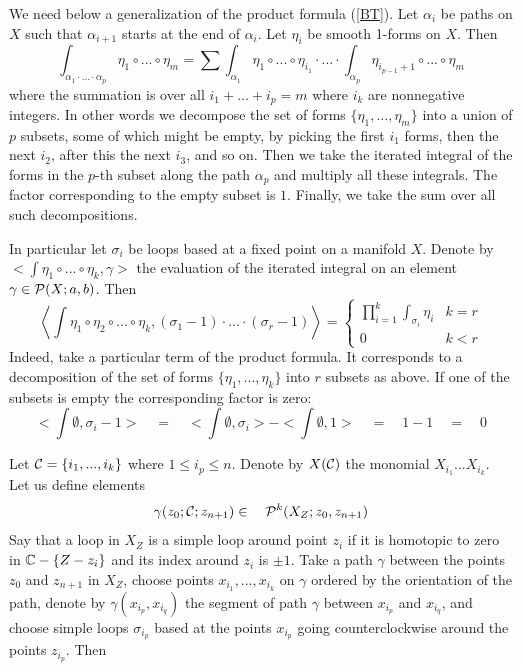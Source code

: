 \documentclass[10pt]{article}
\begin{document}
We need below a generalization of the product formula 
(\ref{BT}). Let $\alpha_i$ be paths on $X$ such that $\alpha_{i+1}$ starts at 
the end of $\alpha_i$.  Let $\eta_i$ be smooth 1-forms on $X$. Then 
\begin{equation} \label{12.29.00.3} 
\int_{\alpha_1 \cdot ... \cdot \alpha_p} \eta_1 \circ  ... \circ \eta_m = \sum 
\int_{\alpha_1}\eta_{1} \circ  ... \circ \eta_{i_1} \cdot ... \cdot 
\int_{\alpha_p}\eta_{i_{p-1}+1} \circ  ... \circ \eta_{m}
\end{equation}
where the summation is over all $i_1 + ... +  i_{p}=m$ where $i_k$ are nonnegative integers. 
In other words we decompose the set 
of forms $\{\eta_1, ..., \eta_m\}$ into a union of $p$ subsets, some of which might be empty, 
by picking the first $i_1$ forms, then the next $i_2$, after this the next $i_3$, and so on. Then we take the iterated integral of the forms in the $p$-th subset 
along the path $\alpha_p$ and   multiply all these integrals. The factor corresponding to 
the empty subset is $1$. Finally, we  take the 
sum over all such decompositions. 

In particular let $\sigma_i$ be loops based at a fixed point on a manifold $X$. 
Denote by $<\int \eta_{1} \circ   ... \circ 
\eta_{k}, \gamma>$ the evaluation of the iterated integral on an element $\gamma 
\in {\cal P}(X; a,b)$. 
 Then 
\begin{equation} \label{12.29.00.2}
\left<\int \eta_{1} \circ \eta_{2} \circ  ... \circ 
\eta_{k}, (\sigma_1 -1)\cdot ... \cdot  (\sigma_r -1)\right> = \left\{ \begin{array}{llll}
 \prod_{i=1}^k \int_{\sigma_i} \eta_i&  k=r \\ 
0&  k<r \end{array} \right.
 \end{equation}
Indeed, take a particular term of the product formula. It corresponds to a decomposition of the set of forms $\{\eta_1, ..., \eta_k\}$ into $r$ subsets as above. 
If one of the subsets is empty the corresponding factor is zero:
$$
<\int \emptyset, \sigma_i-1> \quad = \quad <\int \emptyset, \sigma_i> - <\int \emptyset, 1> \quad = \quad 1-1 \quad =\quad 0
$$

Let ${\cal C} = \{{i_1}, ..., {i_k}\}$ where $1 \leq i_p \leq n$. Denote by 
$X({\cal C})$ the monomial $X_{i_1} ... X_{i_k}$. 
Let us  define elements 
\begin{equation} \label{12.28.00.1}
\gamma(z_0; {\cal C}; z_{n+1}) \in \quad 
{\cal P}^{k}(X_Z; z_0, z_{n+1})
\end{equation}
 Say that a loop in 
$X_Z$ is a simple loop around point $z_i$ if it is homotopic to zero 
in ${\mathbb C}  - \{Z- z_i\}$ and its index around $z_i$ is $\pm 1$. 
Take a path $\gamma$ between the points  
$z_0$ and $z_{n+1}$ in $X_Z$, choose points 
$x_{i_1}, ..., x_{i_k}$ on $\gamma$ ordered  by  the orientation of the path, denote by $\gamma(x_{i_p}, x_{i_q})$ the segment of path $\gamma$ between 
$x_{i_p}$ and $x_{i_q}$, and choose 
simple loops $\sigma_{{i_p}}$ based 
at the points $x_{i_p}$ going counterclockwise 
around the points $z_{i_p}$. 
Then 
\end{document}
